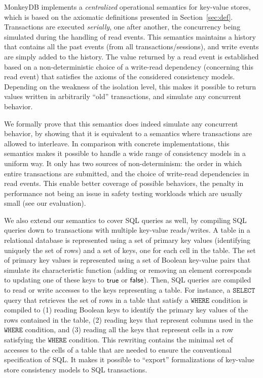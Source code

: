 MonkeyDB implements a \emph{centralized} operational semantics for key-value stores, 
which is based on the axiomatic definitions presented in Section~\ref{sec:def}. 
Transactions are executed \emph{serially}, one after another, the concurrency being simulated during the handling of read events.  
This semantics maintains a history that contains all the past events (from all
transactions/sessions), and write events are simply added to the history. The
value returned by a read event is established based on a non-deterministic
choice of a write-read dependency (concerning this read event) that satisfies
the axioms of the considered consistency models.
Depending on the weakness of the isolation
level, this makes it possible to return values written in arbitrarily ``old''
transactions, and simulate any concurrent behavior. 

We formally prove that this semantics does indeed simulate any concurrent behavior, by 
showing that it is equivalent to a semantics where transactions are allowed to interleave.
In comparison with concrete implementations, this semantics makes it possible to handle 
a wide range of consistency models in a uniform way. It only has two sources of
non-determinism: 
the order in which entire transactions are submitted, and the choice of write-read dependencies in read 
events. This enable better coverage of possible behaviors, the penalty in performance not
being an issue in safety testing workloads which are usually small (see our evaluation). 

We also extend our semantics to cover SQL queries as well, by compiling SQL queries down to transactions 
with multiple key-value reads/writes. A table in a relational database is represented using a set of primary key values 
(identifying uniquely the set of rows) and a set of keys, one for each cell in the table. The set of primary key values is represented using a set of Boolean key-value pairs that simulate its characteristic function (adding or removing an element corresponds to updating one of these keys to $\mathsf{true}$ or $\mathsf{false}$). Then, SQL queries are compiled to read or write accesses to the keys representing a table. For instance, a $\mathtt{SELECT}$ query that retrieves the set of rows in a table that satisfy a $\mathtt{WHERE}$ condition is compiled to (1) reading Boolean keys to identify the primary key values of the rows contained in the table, (2) reading keys that represent columns used in the $\mathtt{WHERE}$ condition, and (3) reading all the keys that represent cells in a row satisfying the $\mathtt{WHERE}$ condition. This rewriting contains the minimal set of accesses to the cells of a table that are needed to ensure the conventional specification of SQL.
It makes it possible to ``export'' formalizations of key-value store consistency models to SQL transactions.


